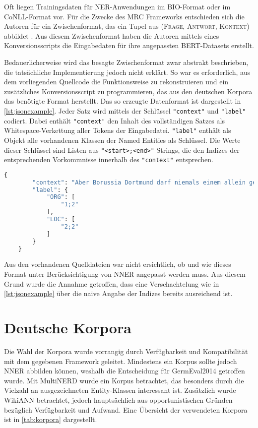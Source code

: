 Oft liegen Trainingsdaten für NER-Anwendungen im BIO-Format oder im CoNLL-Format vor. Für die Zwecke des MRC Frameworks entschieden sich die Autoren für ein Zwischenformat, das ein Tupel aus \textsc{(Frage, Antwort, Kontext)} abbildet \parencite[3]{li2019unified}. Aus diesem Zwischenformat haben die Autoren mittels eines Konversionsscripts die Eingabedaten für ihre angepassten BERT-Datasets erstellt.

Bedauerlicherweise wird das besagte Zwischenformat zwar abstrakt beschrieben, die tatsächliche Implementierung jedoch nicht erklärt. So war es erforderlich, aus dem vorliegenden Quellcode die Funktionsweise zu rekonstruieren und ein zusätzliches Konversionsscript zu programmieren, das aus den deutschen Korpora das benötigte Format herstellt. Das so erzeugte Datenformat ist dargestellt in \autoref{lst:jsonexample}. Jeder Satz wird mittels der Schlüssel \verb|"context"| und \verb|"label"| codiert. Dabei enthält \verb|"context"| den Inhalt des vollständigen Satzes als Whitespace-Verkettung aller Tokens der Eingabedatei. \verb|"label"| enthält als Objekt alle vorhandenen Klassen der Named Entities als Schlüssel. Die Werte dieser Schlüssel sind Listen aus \verb|"<start>;<end>"| Strings, die den Indizes der entsprechenden Vorkommnisse innerhalb des \verb|"context"| entsprechen.

\begin{lstlisting}[caption={Beispiel aus GermEval2014 für das erforderliche JSON-Format}, language={Python}, label={lst:jsonexample}]
	{
		"context": "Aber Borussia Dortmund darf niemals einem allein gehören .",
		"label": {
			"ORG": [
				"1;2"
			],
			"LOC": [
				"2;2"
			]
		}
	}
\end{lstlisting}

Aus den vorhandenen Quelldateien war nicht ersichtlich, ob und wie dieses Format unter Berücksichtigung von NNER angepasst werden muss. Aus diesem Grund wurde die Annahme getroffen, dass eine Verschachtelung wie in \autoref{lst:jsonexample} über die naive Angabe der Indizes bereits ausreichend ist.

\section{Deutsche Korpora}
\label{ch:MRC:sec:Deutsche_Korpora}

Die Wahl der Korpora wurde vorrangig durch Verfügbarkeit und Kompatibilität mit dem gegebenen Framework geleitet. Mindestens ein Korpus sollte jedoch NNER abbilden können, weshalb die Entscheidung für GermEval2014 \parencite{germeval2014} getroffen wurde. Mit MultiNERD \parencite{multinerd} wurde ein Korpus betrachtet, das besonders durch die Vielzahl an ausgezeichneten Entity-Klassen interessant ist. Zusätzlich wurde WikiANN \parencite{wikiann} betrachtet, jedoch hauptsächlich aus opportunistischen Gründen bezüglich Verfügbarkeit und Aufwand. Eine Übersicht der verwendeten Korpora ist in \autoref{tab:korpora} dargestellt.

